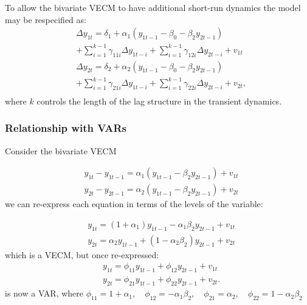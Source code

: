 \documentclass[11pt]{article}
\begin{document}
To allow the bivariate VECM to have additional short-run dynamics the model may be respecified as:
\begin{equation}
\begin{aligned}
& \Delta y_{1 t}=\delta_1+\alpha_1\left(y_{1 t-1}-\beta_0-\beta_2 y_{2 t-1}\right) \\
& +\sum_{i=1}^{k-1} \gamma_{11 i} \Delta y_{1 t-i}+\sum_{i=1}^{k-1} \gamma_{12 i} \Delta y_{2 t-i}+v_{1 t} \\
& \Delta y_{2 t}=\delta_2+\alpha_2\left(y_{1 t-1}-\beta_0-\beta_2 y_{2 t-1}\right) \\
& +\sum_{i=1}^{k-1} \gamma_{21 i} \Delta y_{1 t-i}+\sum_{i=1}^{k-1} \gamma_{22 i} \Delta y_{2 t-i}+v_{2 t}, \\
&
\end{aligned}
\end{equation}
where $k$ controls the length of the lag structure in the transient dynamics.

\subsubsection{Relationship with VARs}

Consider the bivariate VECM

\begin{equation}
\begin{aligned}
& y_{1 t}-y_{1 t-1}=\alpha_1\left(y_{1 t-1}-\beta_2 y_{2 t-1}\right)+v_{1 t} \\
& y_{2 t}-y_{2 t-1}=\alpha_2\left(y_{1 t-1}-\beta_2 y_{2 t-1}\right)+v_{2 t}
\end{aligned}
\end{equation}
we can re-express each equation in terms of the levels of the variable:

\begin{equation}
\label{VECM}
\begin{aligned}
& y_{1 t}=\left(1+\alpha_1\right) y_{1 t-1}-\alpha_1 \beta_2 y_{2 t-1}+v_{1 t} \\
& y_{2 t}=\alpha_2 y_{1 t-1}+\left(1-\alpha_2 \beta_2\right) y_{2 t-1}+v_{2 t}
\end{aligned}
\end{equation}
which is a VECM, but once re-expressed:
\begin{equation}
\label{VAR}
\begin{aligned}
& y_{1 t}=\phi_{11} y_{1 t-1}+\phi_{12} y_{2 t-1}+v_{1 t} \\
& y_{2 t}=\phi_{21} y_{1 t-1}+\phi_{22} y_{2 t-1}+v_{2 t} .
\end{aligned}
\end{equation}
is now a VAR, where $\phi_{11} = 1+ \alpha_1, \quad \phi_{12} = -\alpha_1\beta_2, \quad \phi_{21} = \alpha_2, \quad \phi_{22} = 1-\alpha_2\beta_2$
\end{document}
